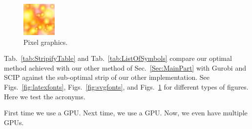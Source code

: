 \begin{figure}
    \centering
    \includegraphics[width=\columnwidth]{imgs/img.png}
    \caption{Pixel graphics.}\label{fig:pixel}
\end{figure}

Tab.~\ref{tab:StripifyTable} and Tab.~\ref{tab:ListOfSymbols} compare our optimal 
method achieved with our other method
of Sec.~\ref{Sec:MainPart} with Gurobi and SCIP against the sub-optimal strip of our 
other implementation.
See Figs.~\ref{fig:latexfonts}, Figs.~\ref{fig:svgfonts}, and Figs.~\ref{fig:pixel} for different types of figures.
Here we test the acronyms.

First time we use a \ac{GPU}.
Next time, we use a \ac{GPU}.
Now, we even have multiple \acp{GPU}.
